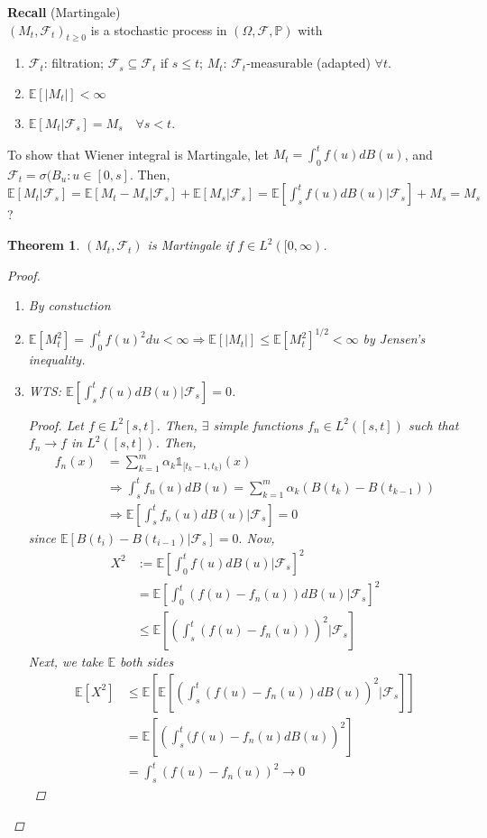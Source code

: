 \documentclass[12pt]{report}
\renewcommand{\P}{\mathbb{P}}
\newcommand{\F}{\mathcal{F}}
\newcommand{\E}{\mathbb{E}}
\renewcommand{\1}{\mathbb{1}}
\renewcommand{\O}{\Omega}
\renewcommand{\subset}{\subseteq}
\theoremstyle{break}
\newtheorem{thm}{Theorem}[section] %
\theoremstyle{newdef}
\theoremstyle{remark}
\begin{document}
\textbf{Recall} (Martingale)\\
$(M_t, \F_t)_{t\geq 0}$ is a stochastic process in $(\O,\F,\P)$ with
\begin{enumerate}
\item
$\F_t$: filtration; $\F_s \subset \F_t$ if $s \leq t$;
$M_t$: $\F_t$-measurable (adapted) $\forall t$.

\item
$\E[|M_t|] < \infty$

\item
$\E[M_t|\F_s] = M_s \quad \forall s < t$.
\end{enumerate}

To show that Wiener integral is Martingale, let
$M_t = \int_0^t f(u)dB(u)$, and
$\F_t = \sigma(B_u: u \in [0,s]$.
Then, $\E[M_t | \F_s]
= \E[M_t - M_s | \F_s] + \E[M_s | \F_s]
= \E[\int_s^t f(u)dB(u)|\F_s] + M_s
= M_s$?

\begin{thm}
$(M_t,\F_t)$ is Martingale if $f \in L^2([0,\infty)$.
\begin{proof}
\begin{enumerate}[wide]
\item
By constuction

\item
$\E[M_t^2] = \int_0^t f(u)^2 du < \infty
\Rightarrow \E[|M_t|] \leq \E[M_t^2]^{1/2} < \infty$ by Jensen's inequality.

\item WTS: $\E[\int_s^t f(u)dB(u) | \F_s] = 0$.
\begin{proof}
Let $f \in L^2[s,t]$.
Then, $\exists$ simple functions $f_n \in L^2([s,t])$ such that
$f_n \rightarrow f$ in $L^2([s,t])$. Then,
$$
\begin{aligned}
f_n(x) &= \sum_{k=1}^m \alpha_k \1_{[t_k-1, t_k)}(x)\\
&\Rightarrow \int_s^t f_n(u)dB(u) = \sum_{k=1}^m \alpha_k (B(t_k)-B(t_{k-1}))\\
&\Rightarrow \E[\int_s^t f_n(u)dB(u) | \F_s] = 0
\end{aligned}
$$
since $\E[B(t_i) - B(t_{i-1}) | \F_s] = 0.
$
Now,
$$
\begin{aligned}
X^2 &:= \E\left[\int_0^t f(u)dB(u) | \F_s\right]^2\\
&= \E\left[\int_0^t (f(u) - f_n(u))dB(u) | \F_s\right]^2\\
&\leq \E\left[\left(\int_s^t (f(u) - f_n(u))\right)^2 | \F_s\right]
\end{aligned}
$$
Next, we take $\E$ both sides
$$
\begin{aligned}
\E[X^2] &\leq \E\left[\E\left[\left(\int_s^t (f(u) - f_n(u)) dB(u) \right)^2 | \F_s \right]\right]\\
&= \E\left[\left(\int_s^t (f(u) - f_n(u) dB(u)\right)^2\right]\\
&= \int_s^t \left(f(u) - f_n(u)\right)^2 \rightarrow 0
\end{aligned}
$$
\end{proof}
\end{enumerate}
\end{proof}
\end{thm}
\end{document}
